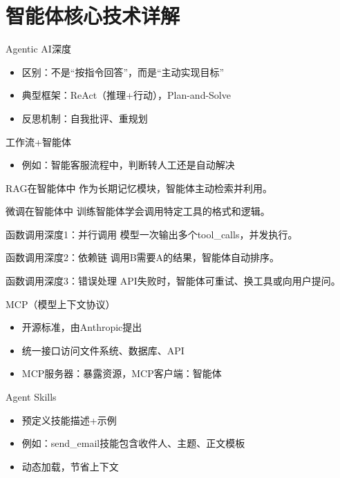 \section{智能体核心技术详解}

\begin{frame}{Agentic AI深度}
\begin{itemize}
\item 区别：不是“按指令回答”，而是“主动实现目标”
\item 典型框架：ReAct（推理+行动），Plan-and-Solve
\item 反思机制：自我批评、重规划
\end{itemize}
\end{frame}
\begin{frame}{工作流+智能体}
\begin{center}
\end{center}
\begin{itemize}
\item 例如：智能客服流程中，判断转人工还是自动解决
\end{itemize}
\end{frame}
\begin{frame}{RAG在智能体中}
作为长期记忆模块，智能体主动检索并利用。
\end{frame}
\begin{frame}{微调在智能体中}
训练智能体学会调用特定工具的格式和逻辑。
\end{frame}
\begin{frame}{函数调用深度1：并行调用}
模型一次输出多个tool\_calls，并发执行。
\end{frame}
\begin{frame}{函数调用深度2：依赖链}
调用B需要A的结果，智能体自动排序。
\end{frame}
\begin{frame}{函数调用深度3：错误处理}
API失败时，智能体可重试、换工具或向用户提问。
\end{frame}
\begin{frame}{MCP（模型上下文协议）}
\begin{itemize}
\item 开源标准，由Anthropic提出
\item 统一接口访问文件系统、数据库、API
\item MCP服务器：暴露资源，MCP客户端：智能体
\end{itemize}
\end{frame}
\begin{frame}{Agent Skills}
\begin{itemize}
\item 预定义技能描述+示例
\item 例如：send_email技能包含收件人、主题、正文模板
\item 动态加载，节省上下文
\end{itemize}
\end{frame}
